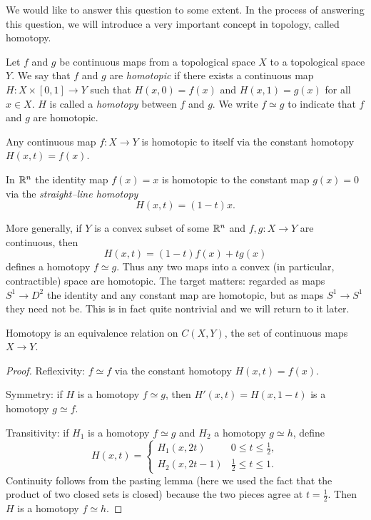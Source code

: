 We would like to answer this question to some extent. In the process of answering this question, we will introduce a very important concept in topology, called homotopy.


\begin{definition}
    Let $f$ and $g$ be continuous maps from a topological space $X$ to a topological space $Y$.  We say that $f$ and $g$ are \emph{homotopic} if there exists a continuous map $H\colon X\times [0,1]\to Y$ such that $H(x,0)=f(x)$ and $H(x,1)=g(x)$ for all $x\in X$. $H$ is called a \emph{homotopy} between $f$ and $g$. We write $f\simeq g$ to indicate that $f$ and $g$ are homotopic.
\end{definition}

\begin{example}
  Any continuous map $f\colon X\to Y$ is homotopic to itself via the constant homotopy $H(x,t)=f(x)$.
\end{example}

\begin{example}
    In $\mathbb{R}^n$ the identity map $f(x)=x$ is homotopic to the constant map $g(x)=0$ via the \emph{straight--line homotopy}
    \[
        H(x,t)=(1-t)x.
    \]
\end{example}

\begin{example}
    More generally, if $Y$ is a convex subset of some $\mathbb{R}^n$ and $f,g\colon X\to Y$ are continuous, then
    \[
        H(x,t)= (1-t)f(x)+t g(x)
    \]
    defines a homotopy $f\simeq g$. Thus any two maps into a convex (in particular, contractible) space are homotopic. The target matters: regarded as maps $S^1\to D^2$ the identity and any constant map are homotopic, but as maps $S^1\to S^1$ they need not be. This is in fact quite nontrivial and we will return to it later.
\end{example}

\begin{proposition}
    Homotopy is an equivalence relation on $C(X,Y)$, the set of continuous maps $X\to Y$.
\end{proposition}

\begin{proof}
    Reflexivity: $f\simeq f$ via the constant homotopy $H(x,t)=f(x)$. 
    
    Symmetry: if $H$ is a homotopy $f\simeq g$, then $H'(x,t)=H(x,1-t)$ is a homotopy $g\simeq f$. 
    
    Transitivity: if $H_1$ is a homotopy $f\simeq g$ and $H_2$ a homotopy $g\simeq h$, define
    \[
        H(x,t)=
        \begin{cases}
            H_1(x,2t) & 0\le t\le \frac12,\\[2pt]
            H_2(x,2t-1) & \frac12\le t\le 1.
        \end{cases}
    \]
    Continuity follows from the pasting lemma (here we used the fact that the product of two closed sets is closed) because the two pieces agree at $t=\frac12$. Then $H$ is a homotopy $f\simeq h$.

    
\end{proof}

